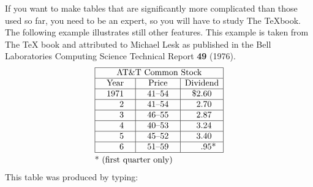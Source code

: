 If you want to make tables that are significantly more complicated than
those used so far, you need to be an expert, so you will have to study
The \TeX book. The following example illustrates still other features.
This example is taken from The \TeX
book and attributed to Michael Lesk as published in the Bell
Laboratories Computing Science Technical Report {\bf 49} (1976).
$$\vbox{\tabskip=0pt \offinterlineskip
\def\tablerule{\noalign{\hrule}}
\halign to150pt{\strut#&\vrule#\tabskip=1em plus2em&
  \hfil#&\vrule#&\hfil#\hfil&\vrule#&
  \hfil#&\vrule#\tabskip=0pt\cr\tablerule
&&\multispan5\hfil AT\&T Common Stock\hfil&\cr\tablerule
&&\omit\hidewidth Year\hidewidth&&
 \omit\hidewidth Price\hidewidth&&
 \omit\hidewidth Dividend\hidewidth&\cr\tablerule
&&1971&&41--54&&\$2.60&\cr\tablerule
&&   2&&41--54&&2.70&\cr\tablerule
&&   3&&46--55&&2.87&\cr\tablerule
&&   4&&40--53&&3.24&\cr\tablerule
&&   5&&45--52&&3.40&\cr\tablerule
&&   6&&51--59&&.95\rlap*&\cr\tablerule
\noalign{\smallskip}
&\multispan7* (first quarter only)\hfil\cr}}$$
This table was produced by typing:
\medskip
